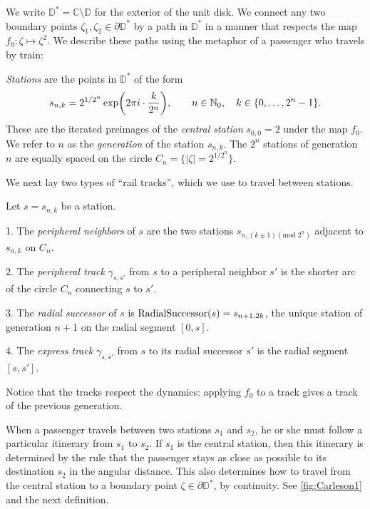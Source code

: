 We write $\mathbb D^* = \mathbb{C} \setminus \mathbb{D}$ for the exterior of the unit disk. We connect any two boundary points $\zeta_1, \zeta_2 \in \partial \mathbb D^*$ by a path in $\mathbb D^*$ in a manner that respects the map 
$f_0: \zeta \mapsto \zeta^2$.
We describe these paths using the metaphor of a passenger who travels by train:

\begin{definition}
\emph{Stations} are the points in $\mathbb D ^*$ of the form 
$$
s_{n,k}=2^{1/2^{n}} \exp \biggl (2\pi i \cdot \frac{k}{2^{n}} \biggr),\qquad n\in\mathbb{N}_{0},\quad k\in \{ 0,\ldots,2^{n}-1 \}.
$$ 
These are the iterated preimages of the \emph{central station} $s_{0,0} = 2$ under the map $f_{0}$.
We refer to $n$ as the \emph{generation} of the station $s_{n,k}$. 
The $2^{n}$ stations of generation $n$ are equally spaced on the circle $C_{n}=\bigl \{ |\zeta|=2^{1/2^{n}} \bigr \} $. 
\end{definition}

We next lay two types of \enquote{rail tracks}, which we use to travel between stations.

\begin{definition}
Let $s=s_{n,k}$ be a station.

1. The \emph{peripheral neighbors} of $s$ are the two stations $s_{n, (k\pm1) (\mathrm{mod}\; 2^{n})}$ adjacent to $s_{n,k}$ on $C_{n}$.

2. The \emph{peripheral track }$\gamma_{s,s'}$ from $s$ to a peripheral neighbor $s'$
is the shorter arc of the circle $C_{n}$ connecting $s$ to $s'$.

3. The \emph{radial successor} of $s$ is $\operatorname{RadialSuccessor}(s)=s_{n+1,2k}$, the unique station of generation $n+1$ on the radial segment $[0,s]$.

4. The \emph{express track} $\gamma_{s,s'}$ from $s$ to its radial successor $s'$ is the radial segment $[s,s']$.
\end{definition}
Notice that the tracks respect the dynamics: applying $f_0$ to a track gives a track of the previous generation.

When a passenger travels between two stations $s_1$ and $s_2$, he or she must follow a particular itinerary from $s_1$ to $s_2$.
If $s_1$ is the central station, then this itinerary is determined by the rule that the passenger stays as close as possible to its destination $s_2$ in the angular distance.
This also determines how to travel from the central station to a boundary point $\zeta\in \partial \mathbb D^*$, by continuity. 
See \cref{fig:Carleson1} and the next definition.


